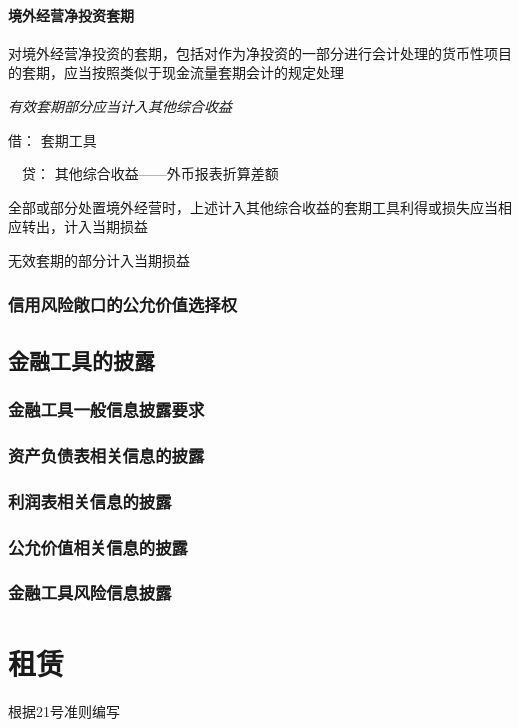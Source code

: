 \documentclass[UTF8,12pt]{ctexart}
\newenvironment{Dr}{\noindent 借：}{\par}
\newenvironment{Cr}{\noindent \ \ 贷：}{\par}
\numberwithin{equation}{section} %
\numberwithin{figure}{section}
\numberwithin{table}{section}
\begin{document}
	\paragraph{境外经营净投资套期}
	对境外经营净投资的套期，包括对作为净投资的一部分进行会计处理的货币性项目的套期，应当按照类似于现金流量套期会计的规定处理
	
	\textit{有效套期部分应当计入其他综合收益}
	
	\begin{Dr}
		套期工具
	\end{Dr}
	\begin{Cr}
		其他综合收益——外币报表折算差额
	\end{Cr}
	
	全部或部分处置境外经营时，上述计入其他综合收益的套期工具利得或损失应当相应转出，计入当期损益
	
	无效套期的部分计入当期损益
	
	
	\subsubsection{信用风险敞口的公允价值选择权}

	
	\subsection{金融工具的披露}
	\subsubsection{金融工具一般信息披露要求}
	\subsubsection{资产负债表相关信息的披露}
	\subsubsection{利润表相关信息的披露}
	\subsubsection{公允价值相关信息的披露}
	\subsubsection{金融工具风险信息披露}
	
	\newpage
	\section{租赁}
	根据21号准则编写
\end{document}

